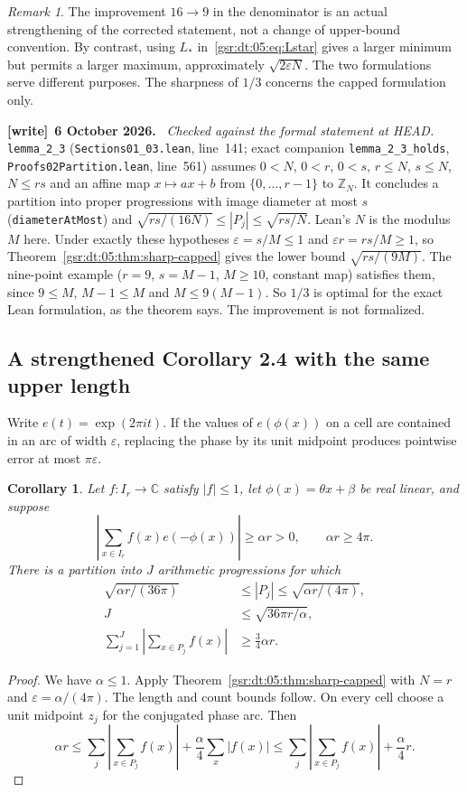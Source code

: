 \documentclass[11pt,letterpaper]{article}
\numberwithin{equation}{section}
\newtheorem{corollary}[theorem]{Corollary}
\theoremstyle{definition}
\theoremstyle{remark}
\newtheorem{remark}[theorem]{Remark}
\newcommand{\Z}{\mathbb Z}
\newcommand{\C}{\mathbb C}
\newcommand{\1}{\mathbf 1}
\newcommand{\eps}{\varepsilon}
\newcommand{\file}[1]{\nolinkurl{#1}}
\newenvironment{writenote}[1][]{\par\smallskip\begingroup\small
 \noindent\textbf{[write]}\if\relax\detokenize{#1}\relax\else~\textbf{#1.}\fi\ }%
 {\par\endgroup\smallskip}
\begin{document}
\begin{remark}
The improvement $16\to9$ in the denominator is an actual strengthening of the corrected statement, not a change of upper-bound convention. By contrast, using $L_*$ in~\eqref{gsr:dt:05:eq:Lstar} gives a larger minimum but permits a larger maximum, approximately $\sqrt{2\eps N}$. The two formulations serve different purposes. The sharpness of $1/3$ concerns the capped formulation only.
\end{remark}
\begin{writenote}[6 October 2026]
\emph{Checked against the formal statement at HEAD.} \file{lemma_2_3} (\file{Sections01\_03.lean}, line~141; exact companion \file{lemma_2_3_holds}, \file{Proofs02Partition.lean}, line~561) assumes $0<N$, $0<r$, $0<s$, $r\le N$, $s\le N$, $N\le rs$ and an affine map $x\mapsto ax+b$ from $\{0,\ldots,r-1\}$ to $\Z_N$. It concludes a partition into proper progressions with image diameter at most $s$ (\texttt{diameterAtMost}) and $\sqrt{rs/(16N)}\le|P_j|\le\sqrt{rs/N}$. Lean's $N$ is the modulus $M$ here. Under exactly these hypotheses $\varepsilon=s/M\le1$ and $\varepsilon r=rs/M\ge1$, so Theorem~\ref{gsr:dt:05:thm:sharp-capped} gives the lower bound $\sqrt{rs/(9M)}$. The nine-point example ($r=9$, $s=M-1$, $M\ge10$, constant map) satisfies them, since $9\le M$, $M-1\le M$ and $M\le9(M-1)$. So $1/3$ is optimal for the exact Lean formulation, as the theorem says. The improvement is not formalized.
\end{writenote}

\subsection{A strengthened Corollary 2.4 with the same upper length}
Write $e(t)=\exp(2\pi i t)$. If the values of $e(\phi(x))$ on a cell are contained in an arc of width $\eps$, replacing the phase by its unit midpoint produces pointwise error at most $\pi\eps$.

\begin{corollary}
\label{gsr:dt:05:cor:cor24}
Let $f:I_r\to\C$ satisfy $|f|\leq1$, let $\phi(x)=\theta x+\beta$ be real linear, and suppose
\[
 \left|\sum_{x\in I_r}f(x)e(-\phi(x))\right|\geq\alpha r>0,
 \qquad \alpha r\geq4\pi.
\]
There is a partition into $J$ arithmetic progressions for which
\begin{align}
 \sqrt{\alpha r/(36\pi)}&\leq |P_j|\leq\sqrt{\alpha r/(4\pi)},\\
 J&\leq\sqrt{36\pi r/\alpha},\\
 \sum_{j=1}^J\left|\sum_{x\in P_j} f(x)\right|&\geq\tfrac34\alpha r.
 \label{gsr:dt:05:eq:cor24-new}
\end{align}
\end{corollary}
\begin{proof}
We have $\alpha\leq1$. Apply Theorem~\ref{gsr:dt:05:thm:sharp-capped} with $N=r$ and $\eps=\alpha/(4\pi)$. The length and count bounds follow. On every cell choose a unit midpoint $z_j$ for the conjugated phase arc. Then
\[
 \alpha r\leq\sum_j\left|\sum_{x\in P_j}f(x)\right|
       +\frac\alpha4\sum_x|f(x)|
 \leq\sum_j\left|\sum_{x\in P_j}f(x)\right|+\frac\alpha4r.
\]
\end{proof}
\end{document}

